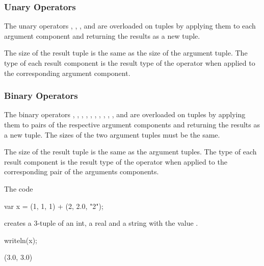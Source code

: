 \subsubsection{Unary Operators}
\label{Tuple_Unary_Operators}

The unary operators \chpl{\+}, \chpl{\-}, \chpl{\~}, and \chpl{\!} are
overloaded on tuples by applying them to each argument component
and returning the results as a new tuple.

The size of the result tuple is the same as the size of the
argument tuple. The type of each result component is the result
type of the operator when applied to the corresponding argument component.

\subsubsection{Binary Operators}
\label{Tuple_Binary_Operators}

The binary operators \chpl{\+}, \chpl{\-}, \chpl{\*}, \chpl{\/}, \chpl{\%},
\chpl{\*\*}, \chpl{\&}, \chpl{\|}, \chpl{\^}, \chpl{\<\<}, and \chpl{\>\>}
are overloaded on tuples by applying them to pairs of the respective
argument components and returning the results as a new tuple.
The sizes of the two argument tuples must be the same.

The size of the result tuple is the same as the argument tuples.  The
type of each result component is the result type of the operator when
applied to the corresponding pair of the arguments components.

\begin{example}
\begin{chapelpre}
\end{chapelpre}
The code
\begin{chapel}
var x = (1, 1, 1) + (2, 2.0, "2");
\end{chapel}
creates a 3-tuple of an int, a real and a string with the value .
\begin{chapelpost}
writeln(x);
\end{chapelpost}
\begin{chapeloutput}
(3.0, 3.0)
\end{chapeloutput}
\end{example}


